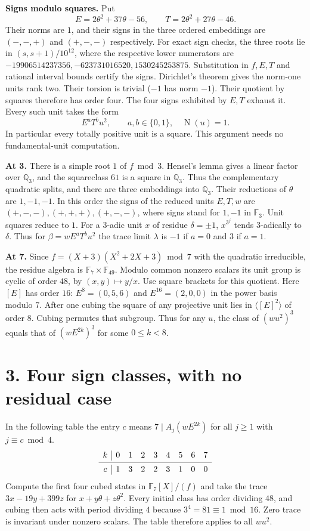 \documentclass[11pt,a4paper,oneside,openany]{book}
\newcommand{\Q}{\mathbb Q}\newcommand{\C}{\mathbb C}\newcommand{\Z}{\mathbb Z}\newcommand{\F}{\mathbb F}\newcommand{\Tr}{\operatorname{Tr}}\newcommand{\Nm}{\operatorname{N}}\newcommand{\ord}{\operatorname{ord}}\newcommand{\K}{K}\newcommand{\OO}{\mathcal O_K}\newcommand{\unit}{\mathcal U}
\newcommand{\lead}[1]{\textbf{#1}\enspace}\let\para\lead
\newcommand{\localhead}[1]{\needspace{5\baselineskip}\section*{\color{ink}#1}}
\let\sect\localhead\let\secx\localhead\let\head\localhead
\begin{document}
\lead{Signs modulo squares.} Put
\[
 E=2\theta^2+37\theta-56,\qquad T=2\theta^2+27\theta-46.
\]
Their norms are $1$, and their signs in the three ordered embeddings are $(-,-,+)$ and $(+,-,-)$ respectively. For exact sign checks, the three roots lie in $(s,s+1)/10^{12}$, where the respective lower numerators are $-19906514237356,-623731016520,1530245253875$. Substitution in $f,E,T$ and rational interval bounds certify the signs. Dirichlet's theorem gives the norm-one units rank two. Their torsion is trivial ($-1$ has norm $-1$). Their quotient by squares therefore has order four. The four signs exhibited by $E,T$ exhaust it. Every such unit takes the form
\[
 E^aT^b u^2,\qquad a,b\in\{0,1\},\quad \Nm(u)=1.
\]
In particular every totally positive unit is a square. This argument needs no fundamental-unit computation.

\lead{At 3.} There is a simple root $1$ of $f\bmod3$. Hensel's lemma gives a linear factor over $\Q_3$, and the squareclass $61$ is a square in $\Q_3$. Thus the complementary quadratic splits, and there are three embeddings into $\Q_3$. Their reductions of $\theta$ are $1,-1,-1$. In this order the signs of the reduced units $E,T,w$ are $(+,-,-),(+,+,+),(+,-,-)$, where signs stand for $1,-1$ in $\F_3$. Unit squares reduce to $1$. For a $3$-adic unit $x$ of residue $\delta=\pm1$, $x^{3^j}$ tends $3$-adically to $\delta$. Thus for $\beta=wE^aT^bu^2$ the trace limit $\lambda$ is $-1$ if $a=0$ and $3$ if $a=1$.

\lead{At 7.} Since $f=(X+3)(X^2+2X+3)\bmod7$ with the quadratic irreducible, the residue algebra is $\F_7\times\F_{49}$. Modulo common nonzero scalars its unit group is cyclic of order $48$, by $(x,y)\mapsto y/x$. Use square brackets for this quotient. Here $[E]$ has order $16$: $E^8=(0,5,6)$ and $E^{16}=(2,0,0)$ in the power basis modulo $7$. After one cubing the square of any projective unit lies in $\langle[E]^2\rangle$ of order $8$. Cubing permutes that subgroup. Thus for any $u$, the class of $(wu^2)^3$ equals that of $(wE^{2k})^3$ for some $0\le k<8$.



\sect{3. Four sign classes, with no residual case}
In the following table the entry $c$ means $7\mid A_j(wE^{2k})$ for all $j\ge1$ with $j\equiv c\bmod4$.
\[
\begin{array}{c|rrrrrrrr}
 k&0&1&2&3&4&5&6&7\\\midrule
 c&1&3&2&2&3&1&0&0
\end{array}
\]
Compute the first four cubed states in $\F_7[X]/(f)$ and take the trace $3x-19y+399z$ for $x+y\theta+z\theta^2$. Every initial class has order dividing $48$, and cubing then acts with period dividing $4$ because $3^4=81\equiv1\bmod16$. Zero trace is invariant under nonzero scalars. The table therefore applies to all $wu^2$.
\end{document}
